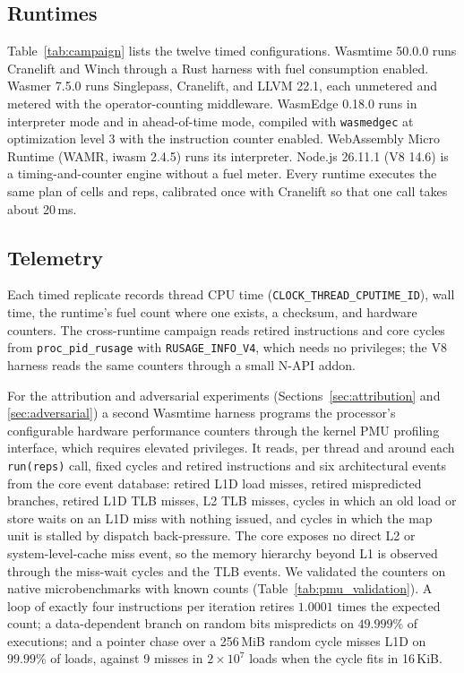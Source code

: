 \documentclass{ws-jcsc}
\begin{document}
\subsection{Runtimes}
Table~\ref{tab:campaign} lists the twelve timed configurations. Wasmtime 50.0.0 runs Cranelift and Winch through a Rust harness with fuel consumption enabled. Wasmer 7.5.0 runs Singlepass, Cranelift, and LLVM 22.1, each unmetered and metered with the operator-counting middleware. WasmEdge 0.18.0 runs in interpreter mode and in ahead-of-time mode, compiled with \texttt{wasmedgec} at optimization level 3 with the instruction counter enabled. WebAssembly Micro Runtime (WAMR, iwasm 2.4.5) runs its interpreter. Node.js 26.11.1 (V8 14.6) is a timing-and-counter engine without a fuel meter. Every runtime executes the same plan of cells and reps, calibrated once with Cranelift so that one call takes about 20\,ms.

\subsection{Telemetry}
Each timed replicate records thread CPU time (\texttt{CLOCK\_THREAD\_CPUTIME\_ID}), wall time, the runtime's fuel count where one exists, a checksum, and hardware counters. The cross-runtime campaign reads retired instructions and core cycles from \texttt{proc\_pid\_rusage} with \texttt{RUSAGE\_INFO\_V4}, which needs no privileges; the V8 harness reads the same counters through a small N-API addon.

For the attribution and adversarial experiments (Sections~\ref{sec:attribution} and \ref{sec:adversarial}) a second Wasmtime harness programs the processor's configurable hardware performance counters through the kernel PMU profiling interface, which requires elevated privileges. It reads, per thread and around each \texttt{run(reps)} call, fixed cycles and retired instructions and six architectural events from the core event database: retired L1D load misses, retired mispredicted branches, retired L1D TLB misses, L2 TLB misses, cycles in which an old load or store waits on an L1D miss with nothing issued, and cycles in which the map unit is stalled by dispatch back-pressure. The core exposes no direct L2 or system-level-cache miss event, so the memory hierarchy beyond L1 is observed through the miss-wait cycles and the TLB events. We validated the counters on native microbenchmarks with known counts (Table~\ref{tab:pmu_validation}). A loop of exactly four instructions per iteration retires $1.0001$ times the expected count; a data-dependent branch on random bits mispredicts on $49.999\%$ of executions; and a pointer chase over a 256\,MiB random cycle misses L1D on $99.99\%$ of loads, against 9 misses in $2\times10^{7}$ loads when the cycle fits in 16\,KiB.
\end{document}
